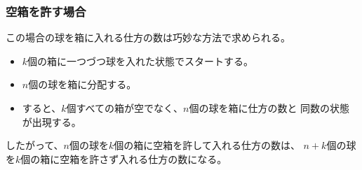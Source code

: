 \subsubsection{空箱を許す場合}\label{s3:空箱を許す場合} %
	この場合の球を箱に入れる仕方の数は巧妙な方法で求められる。
	\begin{itemize}\setlength{\itemsep}{-1mm} %
		\item $k$個の箱に一つづつ球を入れた状態でスタートする。
		\item $n$個の球を箱に分配する。
		\item すると、$k$個すべての箱が空でなく、$n$個の球を箱に仕方の数と
		同数の状態が出現する。
	\end{itemize} %
	したがって、$n$個の球を$k$個の箱に空箱を許して入れる仕方の数は、
	$n+k$個の球を$k$個の箱に空箱を許さず入れる仕方の数になる。
